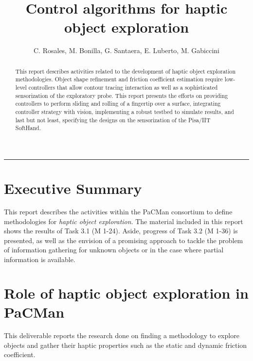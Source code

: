 \documentclass[a4paper,11pt,pdf]{pacmanreport}
\title{Control algorithms for haptic object exploration}
\author{C. Rosales, M. Bonilla, G. Santaera, E. Luberto, M. Gabiccini}
\begin{document}
\maketitle

\begin{abstract}
\noindent This report describes activities related to the development of haptic object exploration methodologies. Object shape refinement and friction coefficient estimation require low-level controllers that allow contour tracing interaction as well as a sophisticated sensorization of the exploratory probe. This report presents the efforts on providing controllers to perform sliding and rolling of a fingertip over a surface, integrating controller strategy with vision, implementing a robust testbed to simulate results, and last but not least, specifying the designs on the sensorization of the Pisa/IIT SoftHand.
\end{abstract}

\vspace{.2em}
\hrule

\footnotesize

\tableofcontents

\normalsize

\newpage

\section*{Executive Summary}
This report describes the activities within the PaCMan consortium to define methodologies for \emph{haptic object exploration}. The material included in this report shows the results of Task 3.1 (M 1-24). Aside, progress of Task 3.2 (M 1-36) is presented, as well as the envision of a promising approach to tackle the problem of information gathering for unknown objects or in the case where partial information is available.

\section*{Role of haptic object exploration in PaCMan}

This deliverable reports the research done on finding a methodology to explore objects and gather their haptic properties such as the static and dynamic friction coefficient.
\end{document}
